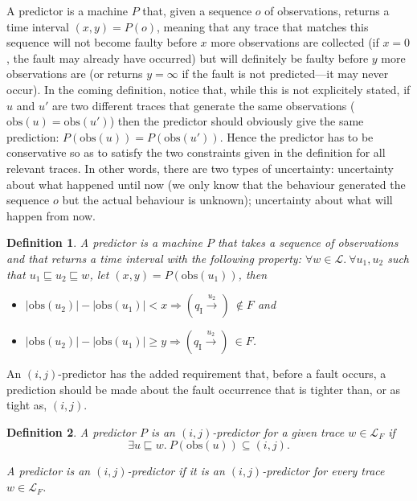 \documentclass{article}
\newtheorem{defi}{Definition}
\newcommand{\prefix}{\sqsubseteq}
\newcommand{\qi}[0]{q_{\mathrm{I}}}
\newcommand{\trans}[1]{\stackrel{#1}{\rightarrow}}
\newcommand{\lang}[0]{\mathcal{L}}
\newcommand{\langf}[1]{\lang_{#1}}
\newcommand{\obs}[0]{\mathrm{obs}}
\begin{document}
A predictor is a machine $P$ that, given a sequence $o$ of observations, 
returns a time interval $(x,y) = P(o)$, 
meaning that any trace that matches this sequence 
will not become faulty before $x$ more observations are collected 
(if $x = 0$, the fault may already have occurred) 
but will definitely be faulty before $y$ more observations are 
(or returns $y = \infty$ if the fault is not predicted---it may never occur).  
In the coming definition, 
notice that, while this is not explicitely stated, 
if $u$ and $u'$ are two different traces 
that generate the same observations ($\obs(u) = \obs(u')$) 
then the predictor should obviously give the same prediction: 
$P(\obs(u)) = P(\obs(u'))$.  
Hence the predictor has to be conservative 
so as to satisfy the two constraints given in the definition 
for all relevant traces.  
In other words, there are two types of uncertainty: 
uncertainty about what happened until now 
(we only know that the behaviour generated the sequence $o$ 
but the actual behaviour is unknown); 
uncertainty about what will happen from now.  

\begin{defi}\label{defi::predictor}
  A \emph{predictor} is a machine $P$ 
  that takes a sequence of observations 
  and that returns a time interval 
  with the following property: 
  $\forall w \in \lang.\ \forall u_1,u_2$ 
  such that $u_1 \prefix u_2 \prefix w$, 
  let $(x,y) = P(\obs(u_1))$, then 
  \begin{itemize}
  \item 
    $|\obs(u_2)| - |\obs(u_1)| < x 
    \Rightarrow (\qi \trans{u_2})\ \not\in F$ and 
  \item 
    $|\obs(u_2)| - |\obs(u_1)| \ge y 
    \Rightarrow (\qi \trans{u_2})\ \in F$.  
  \end{itemize}
\end{defi}

An $(i,j)$-predictor has the added requirement 
that, before a fault occurs, 
a prediction should be made about the fault occurrence 
that is tighter than, or as tight as, $(i,j)$.  

\begin{defi}\label{defi::ijpredictor}
  A predictor $P$ is an \emph{$(i,j)$-predictor
  for a given trace $w \in \langf{F}$} if 
  \begin{displaymath}
    \exists u \prefix w.\ P(\obs(u)) \subseteq (i,j).  
  \end{displaymath}

  A predictor is an \emph{$(i,j)$-predictor} 
  if it is an $(i,j)$-predictor for every trace $w \in \langf{F}$.  
\end{defi}
\end{document}
